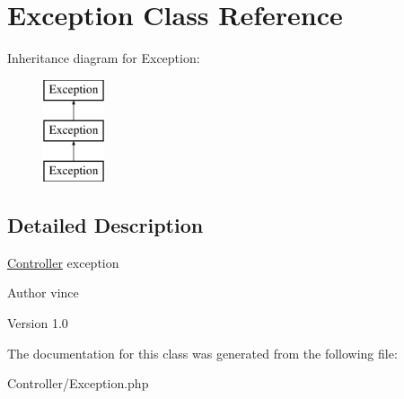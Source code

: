 \hypertarget{class_anemo_1_1_controller_1_1_exception}{
\section{Exception Class Reference}
\label{class_anemo_1_1_controller_1_1_exception}
}
Inheritance diagram for Exception:\begin{figure}[H]
\begin{center}
\leavevmode
\includegraphics[height=3.000000cm]{class_anemo_1_1_controller_1_1_exception}
\end{center}
\end{figure}


\subsection{Detailed Description}
\hyperlink{class_anemo_1_1_controller}{Controller} exception \begin{DoxyAuthor}{Author}
vince 
\end{DoxyAuthor}
\begin{DoxyVersion}{Version}
1.0 
\end{DoxyVersion}


The documentation for this class was generated from the following file:\begin{DoxyCompactItemize}
\item 
Controller/Exception.php\end{DoxyCompactItemize}
